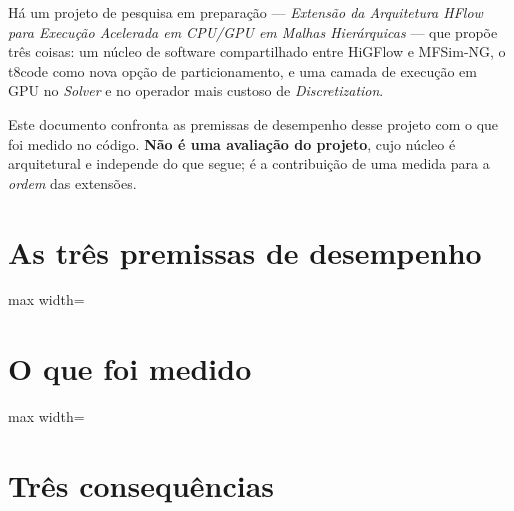 
H\'a um projeto de pesquisa em prepara\c{c}\~ao --- \emph{Extens\~ao da
Arquitetura HFlow para Execu\c{c}\~ao Acelerada em CPU/GPU em Malhas
Hier\'arquicas} --- que prop\~oe tr\^es coisas: um n\'ucleo de software
compartilhado entre HiGFlow e MFSim-NG, o t8code como nova op\c{c}\~ao de
particionamento, e uma camada de execu\c{c}\~ao em GPU no \emph{Solver} e no
operador mais custoso de \emph{Discretization}.

Este documento confronta as premissas de desempenho desse projeto com o que
foi medido no c\'odigo. \textbf{N\~ao \'e uma avalia\c{c}\~ao do projeto}, cujo
n\'ucleo \'e arquitetural e independe do que segue; \'e a contribui\c{c}\~ao de
uma medida para a \emph{ordem} das extens\~oes.

\section{As tr\^es premissas de desempenho}

{\small
\begin{adjustbox}{max width=\linewidth}
\end{adjustbox}
}

\section{O que foi medido}

\begin{adjustbox}{max width=\linewidth}
\end{adjustbox}

\section{Tr\^es consequ\^encias}


